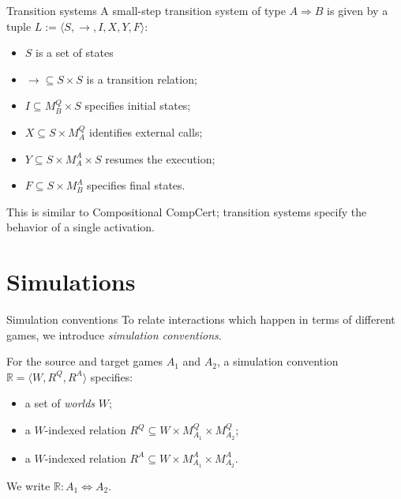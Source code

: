 \documentclass{beamer}
\begin{document}
\begin{frame}{Transition systems} %
A small-step transition system of type $A \Rightarrow B$
is given by a tuple
$L := \langle S, \rightarrow, I, X, Y, F \rangle$:
\begin{itemize}
\item $S$ is a set of states
\item ${\rightarrow} \subseteq S \times S$ is a transition relation;
\item $I \subseteq M_B^Q \times S$ specifies initial states;
\item $X \subseteq S \times M_A^Q$ identifies external calls;
\item $Y \subseteq S \times M_A^A \times S$ resumes the execution;
\item $F \subseteq S \times M_B^A$ specifies final states.
\end{itemize}

\vspace{1em}
This is similar to Compositional CompCert;
transition systems specify the behavior
of a single activation.
\end{frame}


\section{Simulations} %

\begin{frame}{Simulation conventions} %
To relate interactions which happen in terms of different games,
we introduce \emph{simulation conventions}.

\vspace{1em}
For the source and target games $A_1$ and $A_2$,
a simulation convention
$\mathbb{R} = \langle W, R^Q, R^A \rangle$
specifies:
\begin{itemize}
\item a set of \emph{worlds} $W$;
\item a $W$-indexed relation
$R^Q \subseteq W \times M_{A_1}^Q \times M_{A_2}^Q$;
\item a $W$-indexed relation
$R^A \subseteq W \times M_{A_1}^A \times M_{A_2}^A$.
\end{itemize}

\vspace{1em}
We write $\mathbb{R} : A_1 \Leftrightarrow A_2$.
\end{frame}
\end{document}
